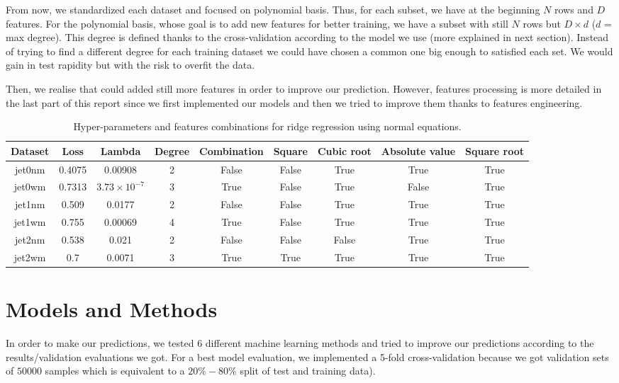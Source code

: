 \documentclass[10pt,conference,compsocconf]{IEEEtran}
\begin{document}
From now, we standardized each dataset and focused on polynomial basis. Thus, for each subset, we have at the beginning $N$ rows and $D$ features. For the polynomial basis, whose goal is to add new features for better training, we have a subset with still $N$ rows but $D\times d$ ($d$ = max degree). This degree is defined thanks to the cross-validation according to the model we use (more explained in next section). Instead of trying to find a different degree for each training dataset we could have chosen a common one big enough to satisfied each set. We would gain in test rapidity but with the risk to overfit the data. 

Then, we realise that could added still more features in order to improve our prediction. However, features processing is more detailed in the last part of this report since we first implemented our models and then we tried to improve them thanks to features engineering.

\begin{table}[htbp]
  \centering
  \begin{tabular}[c]{|c||c|c|c|c|c|c|c|c|}
    \hline
    Dataset&Loss&Lambda&Degree&Combination&Square&Cubic root&Absolute value&Square root \\
    \hline
    \hline
    jet0nm&0.4075&0.00908&2&False&False&True&True&True\\
    jet0wm&0.7313&$3.73\times10^{-7}$&3&True&False&True&False&True\\
    jet1nm&0.509&0.0177&2&False&False&True&True&True\\
    jet1wm&0.755&0.00069&4&True&False&True&True&True\\
    jet2nm&0.538&0.021&2&False&False&False&True&True\\
    jet2wm&0.7&0.0071&3&True&True&True&True&True\\
    \hline
  \end{tabular}
  \caption{Hyper-parameters and features combinations for ridge regression using normal equations.}
  \label{tab:table1}
\end{table}

\section{Models and Methods}
\label{sec:structure-paper}

In order to make our predictions, we tested $6$ different machine learning methods and tried to improve our predictions  according to the results/validation evaluations we got. For a best model evaluation, we implemented a 5-fold cross-validation because we got validation sets of $50 000$ samples which is equivalent to a $20\%-80\%$ split of test and training data). 
\end{document}
